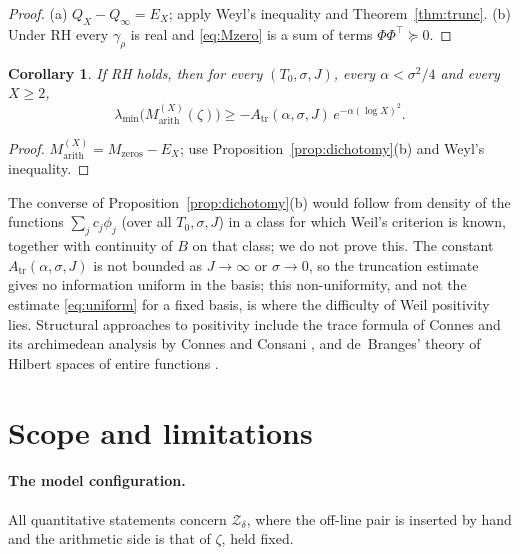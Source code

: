 \documentclass[11pt]{amsart}
\newtheorem{corollary}[theorem]{Corollary}
\theoremstyle{definition}
\theoremstyle{remark}
\newcommand{\lmin}{\lambda_{\min}}
\newcommand{\Atr}{A_{\mathrm{tr}}}
\begin{document}
\begin{proof}
(a) $Q_X-Q_\infty=E_X$; apply Weyl's inequality and Theorem~\ref{thm:trunc}.
(b) Under RH every $\gamma_\rho$ is real and \eqref{eq:Mzero} is a sum of
terms $\Phi\Phi^{\top}\succeq0$.
\end{proof}

\begin{corollary}\label{cor:LB}
If RH holds, then for every $(T_0,\sigma,J)$, every $\alpha<\sigma^2/4$ and
every $X\ge2$,
\[
\lmin\bigl(M^{(X)}_{\mathrm{arith}}(\zeta)\bigr)\ge-\Atr(\alpha,\sigma,J)\,e^{-\alpha(\log X)^2}.
\]
\end{corollary}

\begin{proof}
$M^{(X)}_{\mathrm{arith}}=M_{\mathrm{zeros}}-E_X$; use
Proposition~\ref{prop:dichotomy}(b) and Weyl's inequality.
\end{proof}

The converse of Proposition~\ref{prop:dichotomy}(b) would follow from density
of the functions $\sum_jc_j\phi_j$ (over all $T_0,\sigma,J$) in a class for
which Weil's criterion is known, together with continuity of $B$ on that
class; we do not prove this. The constant $\Atr(\alpha,\sigma,J)$ is not
bounded as $J\to\infty$ or $\sigma\to0$, so the truncation estimate gives no
information uniform in the basis; this non-uniformity, and not the estimate
\eqref{eq:uniform} for a fixed basis, is where the difficulty of Weil
positivity lies. Structural approaches to positivity include the trace
formula of Connes \cite{Connes1999} and its archimedean analysis by Connes
and Consani \cite{bgCC21}, and de~Branges' theory of Hilbert spaces of entire
functions \cite{deBranges}.

\section{Scope and limitations}\label{sec:scope}

\paragraph{The model configuration.}
All quantitative statements concern $\mathcal Z_\delta$, where the off-line
pair is inserted by hand and the arithmetic side is that of $\zeta$, held
fixed.
\end{document}
